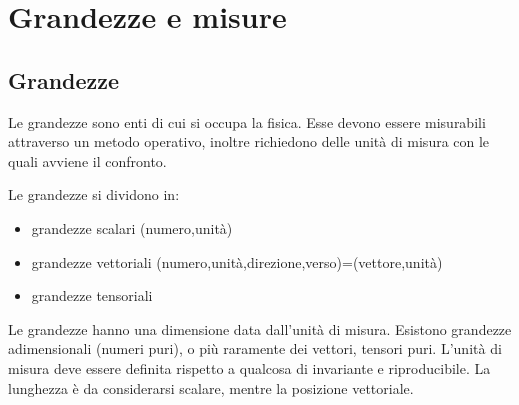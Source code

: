 \chapter{Grandezze e misure}
\minitoc
\section{Grandezze}
Le grandezze sono enti di cui si occupa la fisica. Esse devono essere misurabili attraverso un metodo operativo, inoltre richiedono delle unità di misura con le quali avviene il confronto.
\newline\par
Le grandezze si dividono in:
\begin{itemize}
  \item{}grandezze scalari (numero,unità)
  \item{}grandezze vettoriali
  (numero,unità,direzione,verso)=(vettore,unità)
  \item{}grandezze tensoriali
\end{itemize}
Le grandezze hanno una dimensione data dall'unità di misura. Esistono grandezze adimensionali (numeri puri), o più raramente dei vettori, tensori puri. L'unità di misura deve essere definita rispetto a qualcosa di invariante e riproducibile. La lunghezza è da considerarsi scalare, mentre la posizione vettoriale.


